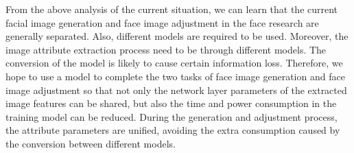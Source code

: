 \vspace{3ex}

From the above analysis of the current situation,
    we can learn that the current facial image generation and face image adjustment in the face research are generally separated.
Also, different models are required to be used.
Moreover, the image attribute extraction process need to be through different models.
The conversion of the model is likely to cause certain information loss.
Therefore, we hope to use a model to complete the two tasks of face image generation and face image adjustment so that not only the network layer parameters of the extracted image features can be shared,
    but also the time and power consumption in the training model can be reduced.
During the generation and adjustment process, the attribute parameters are unified,
    avoiding the extra consumption caused by the conversion between different models.